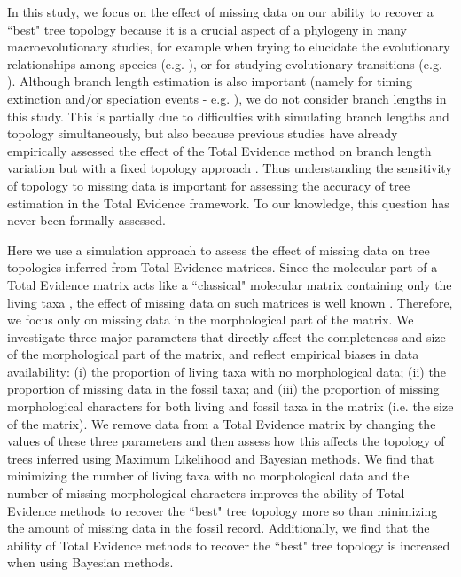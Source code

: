 \documentclass[10pt,letterpaper]{article}
\begin{document}
In this study, we focus on the effect of missing data on our ability to recover a ``best" tree topology because it is a crucial aspect of a phylogeny in many macroevolutionary studies, for example when trying to elucidate the evolutionary relationships among species (e.g. \cite{meredithimpacts2011,jetzthe2012}), or for studying evolutionary transitions (e.g. \cite{friedmanexplosive2010}). Although branch length estimation is also important (namely for timing extinction and/or speciation events - e.g. \cite{ronquista2012}), we do not consider branch lengths in this study. This is partially due to difficulties with simulating branch lengths and topology simultaneously, but also because previous studies have already empirically assessed the effect of the Total Evidence method on branch length variation but with a fixed topology approach \cite{ronquista2012,schragocombining2013,slaterphylogenetic2013,beckancient2014}. Thus understanding the sensitivity of topology to missing data is important for assessing the accuracy of tree estimation in the Total Evidence framework. To our knowledge, this question has never been formally assessed.

Here we use a simulation approach to assess the effect of missing data on tree topologies inferred from Total Evidence matrices. Since the molecular part of a Total Evidence matrix acts like a ``classical" molecular matrix containing only the living taxa \cite{ronquista2012}, the effect of missing data on such matrices is well known \cite{wiensmissing2006,wiensmissing2008,lemmonthe2009,rouresite-specific2011}. Therefore, we focus only on missing data in the morphological part of the matrix. We investigate three major parameters that directly affect the completeness and size of the morphological part of the matrix, and reflect empirical biases in data availability: (i) the proportion of living taxa with no morphological data; (ii) the proportion of missing data in the fossil taxa; and (iii) the proportion of missing morphological characters for both living and fossil taxa in the matrix (i.e. the size of the matrix). We remove data from a Total Evidence matrix by changing the values of these three parameters and then assess how this affects the topology of trees inferred using Maximum Likelihood and Bayesian methods. We find that minimizing the number of living taxa with no morphological data and the number of missing morphological characters improves the ability of Total Evidence methods to recover the ``best" tree topology more so than minimizing the amount of missing data in the fossil record. Additionally, we find that the ability of Total Evidence methods to recover the ``best" tree topology is increased when using Bayesian methods.
\end{document}
